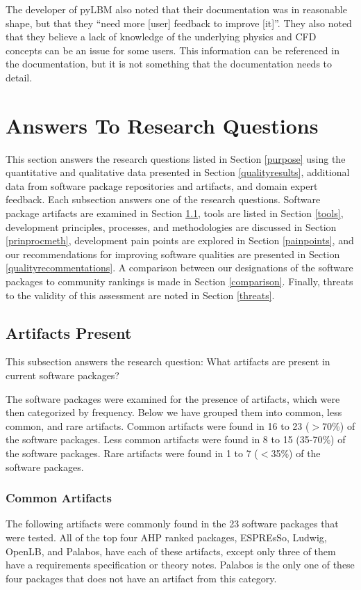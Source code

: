 \documentclass[12pt, notitlepage]{article}
\begin{document}
The developer of pyLBM also noted that their documentation was in reasonable shape, but that they ``need more [user] feedback to improve [it]''. They also noted that they believe a lack of knowledge of the underlying physics and CFD concepts can be an issue for some users. This information can be referenced in the documentation, but it is not something that the documentation needs to detail. 

\newpage


\section{Answers To Research Questions}\label{answersquestions}

This section answers the research questions listed in Section \ref{purpose} using the quantitative and qualitative data presented in Section \ref{qualityresults}, additional data from software package repositories and artifacts, and domain expert feedback. Each subsection answers one of the research questions. Software package artifacts are examined in Section \ref{artifacts}, tools are listed in Section \ref{tools}, development principles, processes, and methodologies are discussed in Section \ref{prinprocmeth}, development pain points are explored in Section \ref{painpoints}, and our recommendations for improving software qualities are presented in Section \ref{qualityrecommentations}. A comparison between our designations of the software packages to community rankings is made in Section \ref{comparison}. Finally, threats to the validity of this assessment are noted in Section \ref{threats}.

\subsection{Artifacts Present}\label{artifacts}

This subsection answers the research question: What artifacts are present in current software packages?

The software packages were examined for the presence of artifacts, which were then categorized by frequency. Below we have grouped them into common, less common, and rare artifacts. Common artifacts were found in 16 to 23 ($>$70\%) of the software packages. Less common artifacts were found in 8 to 15 (35-70\%) of the software packages. Rare artifacts were found in 1 to 7 ($<$35\%) of the software packages. 

\subsubsection{Common Artifacts}
The following artifacts were commonly found in the 23 software packages that were tested. All of the top four AHP ranked packages, ESPREsSo, Ludwig, OpenLB, and Palabos, have each of these artifacts, except only three of them have a requirements specification or theory notes. Palabos is the only one of these four packages that does not have an artifact from this category.
\end{document}
